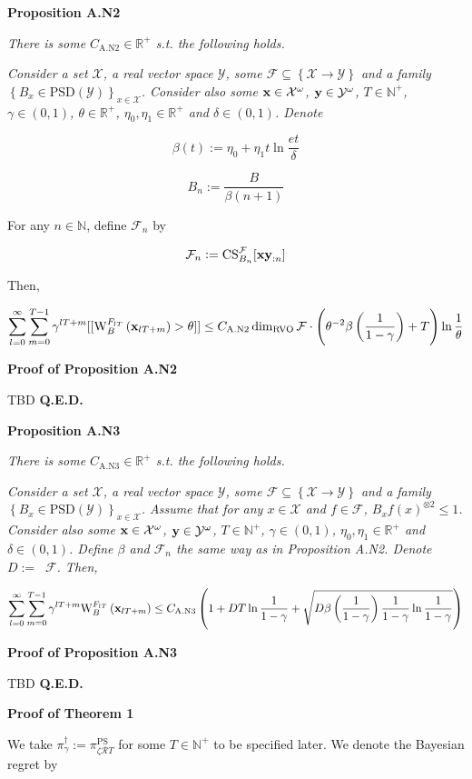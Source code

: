 \documentclass[a4paper]{article}
\newcommand{\Co}[1]{}
\newcommand{\AP}[1]{\left(#1\right)}
\newcommand{\AC}[1]{\left\{#1\right\}}
\newcommand{\Nats}{\mathbb{N}}
\newcommand{\Reals}{\mathbb{R}}
\newcommand{\PSD}{\mathrm{PSD}}
\newcommand{\B}{B}
\newcommand{\X}{\mathcal{X}}
\newcommand{\Y}{\mathcal{Y}}
\newcommand{\F}{\mathcal{F}}
\newcommand{\R}{\mathcal{R}}
\DeclareMathOperator{\RVO}{\dim_{RVO}}
\newcommand{\PSR}{\text{PS}}
\newcommand{\CS}{\mathrm{CS}}
\newcommand{\W}{\mathrm{W}}
\begin{document}
\textbf{Proposition A.N2}\Co{b}

\textit{There is some $C_{\mathrm{A.N2}}\in\Reals^+$ s.t. the following holds.}\Co{i}

\textit{Consider a set $\X$, a real vector space $\Y$, some $\F\subseteq\AC{\X\rightarrow\Y}$ and a family $\AC{\B _x\in\PSD(\Y)}_{x\in\X}$. Consider also some $\bold{x}\in\X^\omega$, $\bold{y}\in\Y^\omega$, $T\in\Nats^+$, $\gamma\in(0,1)$, $\theta\in\Reals^+$, $\eta_0,\eta_1\in\Reals^+$ and $\delta\in(0,1)$. Denote}\Co{i}

$$\beta(t):=\eta_0 + \eta_1t\ln{\frac{et}{\delta}}$$

$$\B _n:=\frac{\B }{\beta(n+1)}$$

For any $n\in\Nats$, define $\F_n$ by

$$\F_n:=\CS^\F_{\B _n}[\bold{xy}_{:n}]$$

Then,

$$\sum_{l=0}^\infty\sum_{m=0}^{T-1}{\gamma^{lT+m}[[\W^{F_{lT}}_\B \AP{\bold{x}_{lT+m}}>\theta]]} \leq C_{\mathrm{A.N2}}\RVO{\F}\cdot\AP{\theta^{-2}\beta\AP{\frac{1}{1-\gamma}}+T}\ln{\frac{1}{\theta}}$$

\textbf{Proof of Proposition A.N2}\Co{b}

TBD \textbf{Q.E.D.}\Co{b}

\textbf{Proposition A.N3}\Co{b}

\textit{There is some $C_{\mathrm{A.N3}}\in\Reals^+$ s.t. the following holds.}\Co{i}

\textit{Consider a set $\X$, a real vector space $\Y$, some $\F\subseteq\AC{\X\rightarrow\Y}$ and a family $\AC{\B _x\in\PSD(\Y)}_{x\in\X}$. Assume that for any $x\in\X$ and $f\in\F$, $\B _x{f(x)}^{\otimes2}\leq 1$. Consider also some $\bold{x}\in\X^\omega$, $\bold{y}\in\Y^\omega$, $T\in\Nats^+$, $\gamma\in(0,1)$, $\eta_0,\eta_1\in\Reals^+$ and $\delta\in(0,1)$. Define $\beta$ and $\F_n$ the same way as in Proposition A.N2. Denote $D:=\RVO{\F}$. Then,}\Co{i}

$$\sum_{l=0}^\infty\sum_{m=0}^{T-1}{\gamma^{lT+m}\W^{F_{lT}}_\B \AP{\bold{x}_{lT+m}}} \leq C_{\mathrm{A.N3}}\AP{1+D T\ln\frac{1}{1-\gamma}+\sqrt{D\beta\AP{\frac{1}{1-\gamma}}\frac{1}{1-\gamma}\ln{\frac{1}{1-\gamma}}}}$$

\textbf{Proof of Proposition A.N3}\Co{b}

TBD \textbf{Q.E.D.}\Co{b}

\textbf{Proof of Theorem 1}\Co{b}

We take $\pi^\dagger_\gamma:=\pi^\PSR_{\zeta\R T}$ for some $T\in\Nats^+$ to be specified later. We denote the Bayesian regret by
\end{document}
